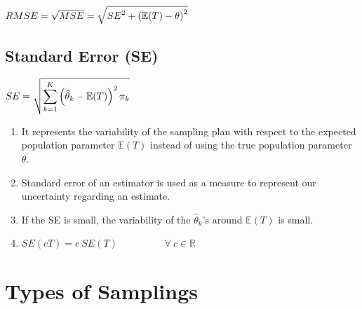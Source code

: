 \hfill
$
    RMSE 
    = \sqrt{MSE} 
    = \sqrt{{SE}^2 + \left(\mathbb{E}(T) - \theta\right)^2}
$
\hfill \cite{statistics/book/Statistics-for-Data-Scientists/Maurits-Kaptein}






\subsection{Standard Error (SE)}\label{Sampling Plans/Measures of closeness/Standard Error (SE)}


\hfill
$
    SE = \sqrt{
        \displaystyle\sum_{k=1}^{K} \left(
            \hat{\theta}_k - \mathbb{E}(T)
        \right)^2
        \pi_k
    }
$
\hfill \cite{statistics/book/Statistics-for-Data-Scientists/Maurits-Kaptein}


\begin{enumerate}
    \item It represents the variability of the sampling plan with respect to the expected population parameter $\mathbb{E}(T)$ instead of using the true population parameter $\theta$.
    \hfill \cite{statistics/book/Statistics-for-Data-Scientists/Maurits-Kaptein}

    \item Standard error of an estimator is used as a measure to represent our uncertainty regarding an estimate.
    \hfill \cite{statistics/book/Statistics-for-Data-Scientists/Maurits-Kaptein}

    \item If the SE is small, the variability of the $\hat{\theta}_k$’s around $\mathbb{E}(T)$ is small. 
    \hfill \cite{statistics/book/Statistics-for-Data-Scientists/Maurits-Kaptein}

    \item $SE(cT ) = c\ SE(T) \hspace{2cm} \forall\  c \in \mathbb{R}$
    \hfill \cite{statistics/book/Statistics-for-Data-Scientists/Maurits-Kaptein}
\end{enumerate}








\section{Types of Samplings}

